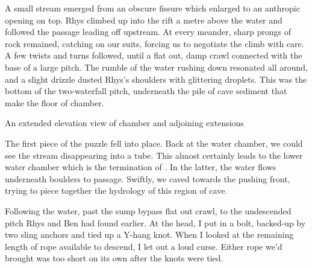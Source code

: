     A small stream emerged from an obscure fissure which enlarged to an anthropic opening on top. Rhys climbed up into the rift a metre above the water and followed the passage leading off upstream. At every meander, sharp prongs of rock remained, catching on our suits, forcing us to negotiate the climb with care. A few twists and turns followed, until a flat out, damp crawl connected with the base of a large pitch. The rumble of the water rushing down resonated all around, and a slight drizzle dusted Rhys's shoulders with glittering droplets. This was the bottom of the two-waterfall pitch, underneath the pile of  cave sediment that make the floor of  chamber.

    \begin{survey*}[t!]
        \checkoddpage \ifoddpage \forcerectofloat \else \forceversofloat \fi
        \centering

        \caption[Touching the Void - grade 1]{An extended elevation view of \protect{} chamber and adjoining \protect{} extensions }
        \label{helms deep}
         
    \end{survey*}

	The first piece of the puzzle fell into place. Back at the water chamber, we could see the stream disappearing into a tube. This almost certainly leads to the lower water chamber which is the termination of . In the latter, the water flows underneath boulders to  passage. Swiftly, we caved towards the pushing front, trying to piece together the hydrology of this region of cave.



 Following the water, past the sump bypass flat out crawl, to the undescended pitch Rhys and Ben had found earlier. At the head, I put in a bolt, backed-up by two sling anchors and tied up a Y-hang knot. When I looked at the remaining length of rope available to descend, I let out a loud curse. Either rope we'd brought was too short on its own after the knots were tied.

